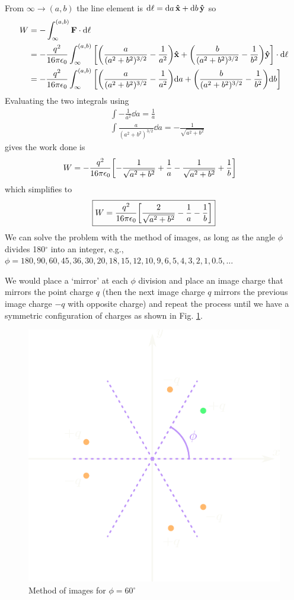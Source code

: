 \documentclass[../main.tex]{subfiles}
\begin{document}
From $\infty \to (a,b)$ the line element is $\dd \ell = \dd{a} \vu x + \dd{b} \vu y$ so
\begin{align*}
    W &= -\int_\infty^{(a, b)} \vb F \cdot \dd\ell \\
    &= -\frac{q^2}{16\pi \epsilon_0} \int_\infty^{(a,b)}  \qt[
        \qt(\frac{a}{(a^2 + b^2)^{3/2}} - \frac{1}{a^2}) \vu x + \qt(\frac{b}{(a^2 + b^2)^{3/2}} - \frac{1}{b^2}) \vu y
    ] \cdot \dd \ell \\
    &= -\frac{q^2}{16\pi \epsilon_0} \int_\infty^{(a,b)} \qt[
        \qt(\frac{a}{(a^2 + b^2)^{3/2}} - \frac{1}{a^2}) \dd a + \qt(\frac{b}{(a^2 + b^2)^{3/2}} - \frac{1}{b^2}) \dd b
    ]
\end{align*}
Evaluating the two integrals using 
\begin{align*}
    &\int -\frac{1}{a^2} \dd a = \frac{1}{a} \\
    &\int \frac{a}{(a^2 + b^2)^{3/2}} \dd a = -\frac{1}{\sqrt{a^2 + b^2}}
\end{align*}
gives the work done is
\begin{align*}
    W &= -\frac{q^2}{16\pi \epsilon_0} \qt[
        - \frac{1}{\sqrt{a^2 + b^2}} + \frac{1}{a} - \frac{1}{\sqrt{a^2 + b^2}}  + \frac{1}{b}
    ]
\end{align*}
which simplifies to
\begin{align*}
    \boxed{
        W = \frac{q^2}{16\pi \epsilon_0} \qt[
            \frac{2}{\sqrt{a^2 + b^2}} - \frac{1}{a} - \frac{1}{b}
        ]
    }
\end{align*}
We can solve the problem with the method of images, as long as the angle $\phi$ divides 180$^\circ$ into an integer,
e.g., $\phi = 180, 90, 60, 45, 36, 30, 20, 18, 15, 12, 10, 9, 6, 5, 4, 3, 2, 1, 0.5, \dots$

We would place a `mirror' at each $\phi$ division and place an image charge that mirrors the point charge $q$ (then the next image charge $q$ mirrors the previous image charge $-q$ with opposite charge) and repeat
the process until we have a symmetric configuration of charges as shown in Fig. \ref{fig:3.15c}.
\begin{figure} [ht]
    \centering
    \includegraphics[width=0.5\linewidth]{hw3_15c.png}
    \caption{Method of images for $\phi = 60^\circ$}
    \label{fig:3.15c}
\end{figure}
\end{document}
